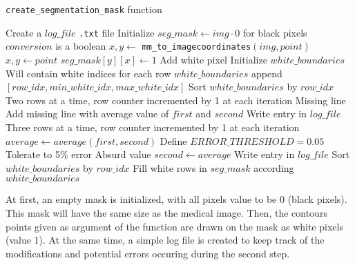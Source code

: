 \begin{algorithm}[t!]
  \caption{\texttt{create\_segmentation\_mask} function}
  \label{algo:createsegmask}
  \begin{algorithmic}[1]
    \State Create a $log\_file$ \Comment \texttt{.txt} file
    \State Initialize $seg\_mask \gets img \cdot 0$  for black pixels
       \Comment $conversion$ is a boolean
        \State $x, y \gets$ \texttt{mm\_to\_imagecoordinates}$(img, point)$
      \Else
        \State $x, y \gets point$
      \EndIf
      \State $seg\_mask[y][x] \gets 1$ \Comment Add white pixel
    \EndFor
    \State Initialize $white\_boundaries$\Comment Will contain white indices for each row
      \State $white\_boundaries$ append $[row\_idx, min\_white\_idx, max\_white\_idx]$
    \EndFor
    \State Sort $white\_boundaries$ by $row\_idx$
    \State \Comment Two rows at a time, row counter incremented by 1 at each iteration
       \Comment Missing line
        \State Add missing line with average value of $first$ and $second$
        \State Write entry in $log\_file$
      \EndIf
    \EndFor
    \State \Comment Three rows at a time, row counter incremented by 1 at each iteration
      \State $average \gets average(first, second)$
      \State Define $ERROR\_THRESHOLD = 0.05$ \Comment Tolerate to 5\% error
       \Comment Absurd value
        \State $second \gets average$
        \State Write entry in $log\_file$
      \EndIf
    \EndFor
    \State Sort $white\_boundaries$ by $row\_idx$
    \State Fill white rows in $seg\_mask$ according $white\_boundaries$
    \State {}
    \EndFunction
  \end{algorithmic}
\end{algorithm}

At first, an empty mask is initialized, with all pixels value to be 0 (black pixels). This mask will have the same size as the medical image. Then, the contours points given as argument of the function are drawn on the mask as white pixels (value 1). At the same time, a simple log file is created to keep track of the modifications and potential errors occuring during the second step.

